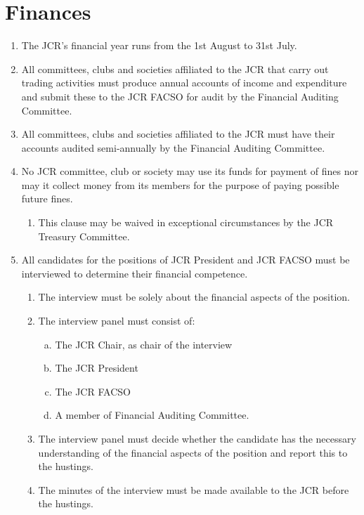 \documentclass[12pt]{article}
\begin{document}
\section{Finances}
\begin{enumerate}
    \item The JCR’s financial year runs from the 1st August to 31st July.
    \item All committees, clubs and societies affiliated to the JCR that carry out trading activities must produce annual accounts of income and expenditure and submit these to the JCR FACSO for audit by the Financial Auditing Committee.
    \item All committees, clubs and societies affiliated to the JCR must have their accounts audited semi-annually by the Financial Auditing Committee.
    \item No JCR committee, club or society may use its funds for payment of fines nor may it collect money from its members for the purpose of paying possible future fines.
    \begin{enumerate}
        \item This clause may be waived in exceptional circumstances by the JCR Treasury Committee.
    \end{enumerate}
    \item All candidates for the positions of JCR President and JCR FACSO must be interviewed to determine their financial competence.
    \begin{enumerate}
        \item The interview must be solely about the financial aspects of the position.
        \item The interview panel must consist of:
        \begin{enumerate}[(a)]
            \item The JCR Chair, as chair of the interview
            \item The JCR President
            \item The JCR FACSO
            \item A member of Financial Auditing Committee.
        \end{enumerate}
        \item The interview panel must decide whether the candidate has the necessary understanding of the financial aspects of the position and report this to the hustings.
        \item The minutes of the interview must be made available to the JCR before the hustings.
    \end{enumerate}

\end{enumerate}
\end{document}
